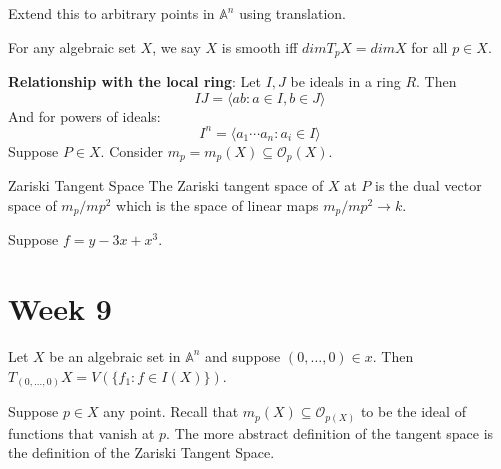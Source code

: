 \documentclass{report}
\begin{document}
Extend this to arbitrary points in $\mathbb{A}^{n}$ using translation.

For any algebraic set $X$, we say $X$ is smooth iff $dim T_{p}X= dim X$ for all $p \in X$.

\textbf{Relationship with the local ring}: Let $I, J$ be ideals in a ring $R$. Then 
    \begin{equation*}
        IJ = \langle ab : a \in I, b \in J \rangle
    \end{equation*}
And for powers of ideals:
    \begin{equation*}
        I^{n} = \langle a_{1}\cdots a_{n} : a_{i}\in I \rangle
    \end{equation*}
Suppose $P \in X$. Consider $m_{p} = m_{p}(X) \subseteq  \mathcal{O}_{p}(X)$. 

\begin{definition}{Zariski Tangent Space}
    The Zariski tangent space of $X$ at $P$ is the dual vector space of $ m_{p}/mp^{2}$ which is the space of linear maps $m_{p}/mp^{2} \rightarrow k$.
\end{definition}

\begin{examples}
    \begin{example}
        Suppose $f = y - 3x + x^{3}$. 
    \end{example}
\end{examples}

\chapter{Week 9}

Let $X$ be an algebraic set in $\mathbb{A}^{n}$ and suppose $(0, \ldots , 0) \in x$. Then $T_{(0, \ldots , 0)}X = V(\{f_{1} : f \in I(X)\})$.

Suppose $p \in X$ any point. Recall that $m_{p}(X) \subseteq \mathcal{O}_{p(X)}$ to be the ideal of functions that vanish at $p$. The more abstract definition of the tangent space is the definition of the Zariski Tangent Space.
\end{document}
